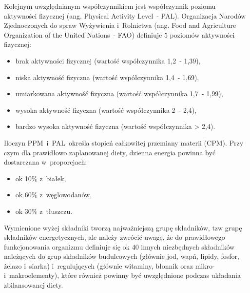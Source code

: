 \par
Kolejnym uwzględnianym współczynnikiem jest współczynnik poziomu aktywności fizycznej (ang. Physical Activity Level~- PAL).
Organizacja Narodów Zjednoczonych do spraw Wyżywienia i~Rolnictwa (ang. Food and Agriculture Organization of the United Nations~- FAO) definiuje 5 poziomów aktywności fizycznej\cite{url:fao-pal}:
\begin{itemize}
    \item brak aktywności fizycznej (wartość współczynnika 1,2~- 1,39),
    \item niska aktywność fizyczna (wartość współczynnika 1,4~- 1,69),
    \item umiarkowana aktywność fizyczna (wartość współczynnika 1,7~- 1,99),
    \item wysoka aktywność fizyczna (wartość współczynnika 2~- 2,4),
    \item bardzo wysoka aktywność fizyczna (wartość współczynnika > 2,4).
\end{itemize}

\par
Iloczyn PPM~i~PAL~określa stopień całkowitej przemiany materii (CPM)\cite{book:normy-zywienia-czlowieka}.
Przy czym dla prawidłowo zaplanowanej diety, dzienna energia powinna być dostarczana w~proporcjach:
\begin{itemize}
    \item ok 10\% z~białek,
    \item ok 60\% z~węglowodanów,
    \item ok 30\% z~tłuszczu.
\end{itemize}

Wymienione wyżej składniki tworzą najważniejszą grupę składników, tzw grupę składników energetycznych, ale należy zwrócić uwagę,
że do prawidłowego funkcjonowania organizmu definiuje się ok 40 innych niezbędnych składników należących do grup składników budulcowych
(głównie jod, wapń, lipidy, fosfor, żelazo i~siarka) i~regulujących (głównie witaminy, błonnik oraz mikro- i~makroelementy),
które również powinny być uwzględnione podczas układania zbilansowanej diety\cite{book:dietetyka-zywienie-zdrowego-i-chorego-czlowieka}.

